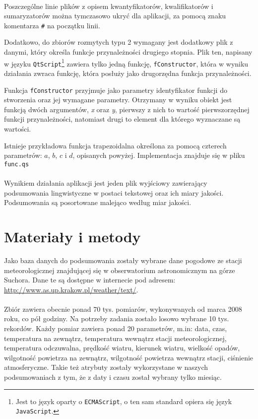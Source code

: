 \documentclass{classrep}
\begin{document}
\paragraph{}
Poszczególne linie plików z opisem kwantyfikatorów, kwalifikatorów i sumaryzatorów można tymczasowo ukryć dla aplikacji, za pomocą znaku komentarza \verb|#| na początku linii.

Dodatkowo, do zbiorów rozmytych typu 2 wymagany jest dodatkowy plik z danymi, który określa funkcje przynależności drugiego stopnia. Plik ten, napisany w języku \verb|QtScript|\footnote{Jest to język oparty o \texttt{ECMAScript}, o ten sam standard opiera się język \texttt{JavaScript}.} zawiera tylko jedną funkcję, \verb|fConstructor|, która w wyniku działania zwraca funkcję, która posłuży jako drugorzędna funkcja przynależności.

Funkcja \verb|fConstructor| przyjmuje jako parametry identyfikator funkcji do stworzenia oraz jej wymagane parametry. Otrzymany w wyniku obiekt jest funkcją dwóch argumentów, \textit{x} oraz \textit{y}, pierwszy z nich to wartość pierwszorzędnej funkcji przynależności, natomiast drugi to element dla którego wyznaczane są wartości.

Istnieje przykładowa funkcja trapezoidalna określona za pomocą czterech parametrów: $a$, $b$, $c$ i $d$, opisanych powyżej. Implementacja znajduje się w pliku \verb|func.qs|

\paragraph{}
Wynikiem działania aplikacji jest jeden plik wyjściowy zawierający podsumowania lingwistyczne w postaci tekstowej oraz ich miary jakości. Podsumowania są posortowane malejąco według miar jakości.

\section{Materiały i metody}
Jako baza danych do podsumowania zostały wybrane dane pogodowe ze stacji meteorologicznej znajdującej się w obserwatorium astronomicznym na górze Suchora. Dane te są dostępne w internecie pod adresem:
\url{http://www.as.up.krakow.pl/weather/text/}.

\paragraph{}
Zbiór zawiera obecnie ponad 70 tys. pomiarów, wykonywanych od marca 2008 roku, co pół godziny. Na potrzeby zadania zostało losowo wybrane 10 tys. rekordów.
Każdy pomiar zawiera ponad 20 parametrów, m.in: data, czas, temperatura na zewnątrz, temperatura wewnątrz stacji meteorologicznej, temperatura odczuwalna, prędkość wiatru, kierunek wiatru, wielkość opadów, wilgotność powietrza na zewnątrz, wilgotność powietrza wewnątrz stacji, ciśnienie atmosferyczne. Takie też atrybuty zostały wykorzystane w naszych podsumowaniach z tym, że z daty i czasu został wybrany tylko miesiąc.
\end{document}
